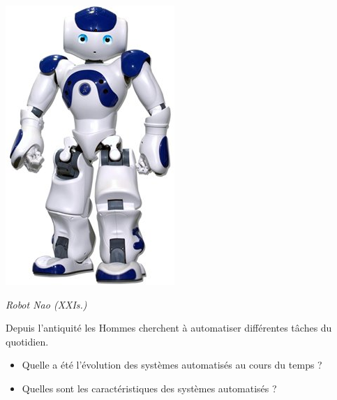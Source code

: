 \documentclass[11pt,oneside]{article}
\begin{document}
\begin{minipage}[c]{.25\linewidth}
\begin{center}
\includegraphics[width=\textwidth]{png/nao}

\textit{Robot Nao (XXI\ieme s.)}
\end{center}
\end{minipage}



\vspace{.2cm}

Depuis l'antiquité les Hommes cherchent à automatiser différentes tâches du quotidien. 
\begin{itemize}
\item Quelle a été l'évolution des systèmes automatisés au cours du temps ?
\item Quelles sont les caractéristiques des systèmes automatisés ?
\end{itemize}
\end{document}
